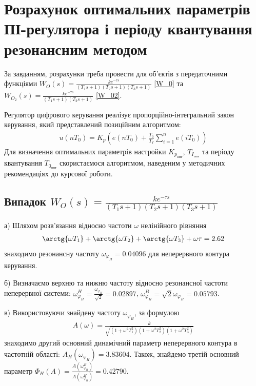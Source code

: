 \chapter{Розрахунок оптимальних параметрів ПІ-регулятора і 
періоду квантування резонансним методом}\label{ch:resonance}
За завданням, розрахунки треба провести для об'єктів з передаточними функціями
$W_O(s) = \frac{
    k e^{-\tau s}
}{
    (T_1 s + 1) (T_2 s + 1) (T_3 s + 1)
}$ \eqref{W_0} та
$
W_{O_2}(s) = \frac{k e^{-\tau s}}{(T_1 s + 1)(T_2 s + 1)}
$ \eqref{W_02}.

Регулятор цифрового керування реалізує пропорційно-інтегральний закон керування, який представлений позиційним алгоритмом:
\begin{gather*}
    u(n T_0) = K_p \left(
        e(n T_0) + \frac{T_0}{T_I} \sum_{i=1}^n e(i T_0)
    \right)
\end{gather*}
Для визначення оптимальних параметрів настройки $K_{p_{\text{опт}}}$, $T_{I_{\text{опт}}}$ та періоду квантування
$T_{0_{\text{опт}}}$ скористаємося алгоритмом, наведеним у методичних рекомендаціях до курсової роботи.

\section{Випадок \texorpdfstring{$W_O(s) = \frac{
    k e^{-\tau s}
}{
    (T_1 s + 1) (T_2 s + 1) (T_3 s + 1)
}$}{1}}\label{sec:resonance_3rd_order}
а)\;  Шляхом розв'язання відносно частоти $\omega$ нелінійного рівняння
\begin{gather}
    \arctg{\omega T_1} + \arctg{\omega T_2} + \arctg{\omega T_3} + \omega \tau = 2.62
\end{gather}
знаходимо резонансну частоту $\omega_{\varphi_H} = 0.04096$ для неперервного контура керування.

б)\;  Визначаємо верхню та нижню частоту відносно резонансної частоти неперервної системи:
$\omega_{\varphi_H}^H = \frac{\omega_{\varphi_H}}{\sqrt{2}} = 0.02897$, 
$\omega_{\varphi_H}^B = {\sqrt{2}}{\omega_{\varphi_H}} = 0.05793$.

в)\; Використовуючи знайдену частоту $\omega_{\varphi_H}$, за формулою
\begin{gather}
    A(\omega) = \frac{k}{\sqrt{\left(1+\omega^2 T_1^2\right)\left(1+\omega^2 T_2^2\right)\left(1+\omega^2 T_3^2\right)}}
\end{gather}
знаходимо другий основний динамічний параметр неперервного контура в частотній області:
$A_H\left(\omega_{\varphi_H}\right) = 3.83604$. Також, знайдемо третій основний параметр
$\Phi_H(A) = \frac{A\left(\omega_{\varphi_H}^B\right)}{A\left(\omega_{\varphi_H}^H\right)} = 0.42790$.

